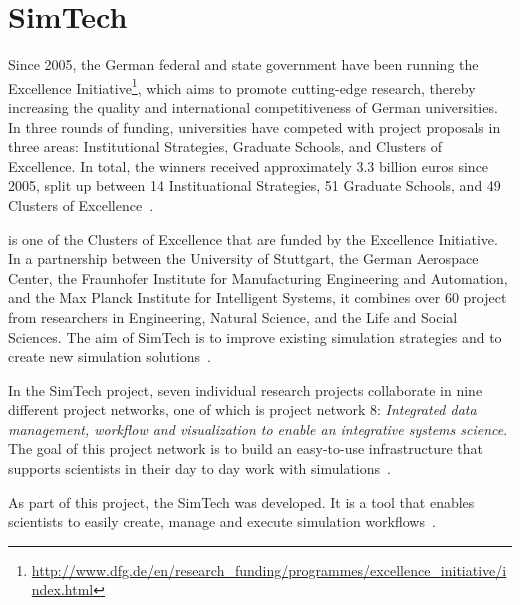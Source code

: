 \section{SimTech}

Since 2005, the German federal and state government have been running the Excellence Initiative\footnote{\url{http://www.dfg.de/en/research_funding/programmes/excellence_initiative/index.html}}, which aims to promote cutting-edge research, thereby increasing the quality and international competitiveness of German universities.
In three rounds of funding, universities have competed with project proposals in three areas: Institutional Strategies, Graduate Schools, and Clusters of Excellence.
In total, the winners received approximately 3.3 billion euros since 2005, split up between 14 Instituational Strategies, 51 Graduate Schools, and 49 Clusters of Excellence~\autocite[pp.~16-18]{excellence:glance}.

 is one of the Clusters of Excellence that are funded by the Excellence Initiative.
In a partnership between the University of Stuttgart, the German Aerospace Center, the Fraunhofer Institute for Manufacturing Engineering and Automation, and the Max Planck Institute for Intelligent Systems, it combines over 60 project from researchers in Engineering, Natural Science, and the Life and Social Sciences.
The aim of SimTech is to improve existing simulation strategies and to create new simulation solutions~\autocite[pp.~109]{excellence:glance}.

In the SimTech project, seven individual research projects collaborate in nine different project networks, one of which is project network 8: \textit{Integrated data management, workflow and visualization to enable an integrative systems science}.
The goal of this project network is to build an easy-to-use infrastructure that supports scientists in their day to day work with simulations~\autocite{simtech:projectnetwork8}.

As part of this project, the SimTech  was developed.
It is a tool that enables scientists to easily create, manage and execute simulation workflows~\autocite{workflow:simulation:flexibility}.

